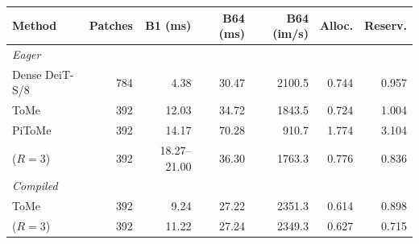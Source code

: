 \begin{tabular}{lrrrrrr}
\toprule
Method & Patches & B1 (ms) & B64 (ms) & B64 (im/s) & Alloc. & Reserv. \\
\midrule
\multicolumn{7}{l}{\textit{Eager}} \\
Dense DeiT-S/8 & 784 & 4.38 & 30.47 & 2100.5 & 0.744 & 0.957 \\
ToMe & 392 & 12.03 & 34.72 & 1843.5 & 0.724 & 1.004 \\
PiToMe & 392 & 14.17 & 70.28 & 910.7 & 1.774 & 3.104 \\
\mn{} ($R=3$) & 392 & 18.27--21.00 & 36.30 & 1763.3 & 0.776 & 0.836 \\
\midrule
\multicolumn{7}{l}{\textit{Compiled}} \\
ToMe & 392 & 9.24 & 27.22 & 2351.3 & 0.614 & 0.898 \\
\mn{} ($R=3$) & 392 & 11.22 & 27.24 & 2349.3 & 0.627 & 0.715 \\
\bottomrule
\end{tabular}

